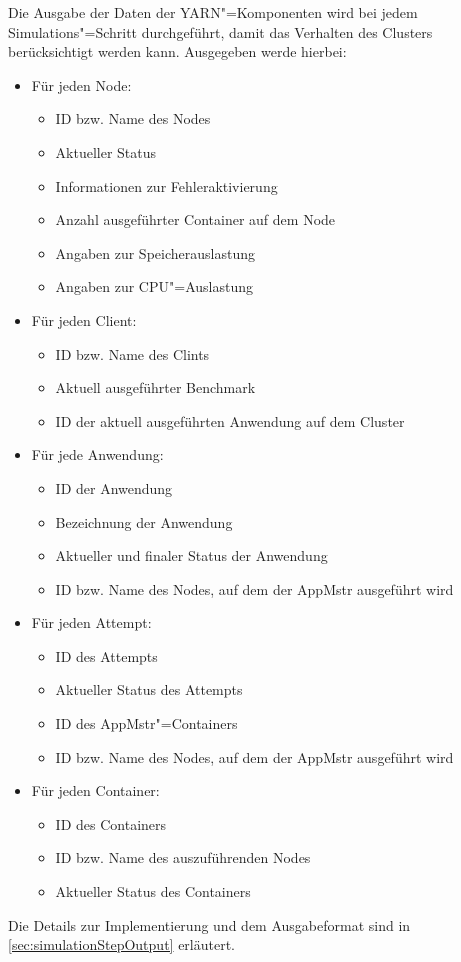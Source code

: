 Die Ausgabe der Daten der YARN"=Komponenten wird bei jedem Simulations"=Schritt durchgeführt, damit das Verhalten des Clusters berücksichtigt werden kann.
Ausgegeben werde hierbei:

\begin{itemize}
    \item Für jeden Node:
    \begin{itemize}
        \item ID bzw. Name des Nodes
        \item Aktueller Status
        \item Informationen zur Fehleraktivierung
        \item Anzahl ausgeführter Container auf dem Node
        \item Angaben zur Speicherauslastung
        \item Angaben zur CPU"=Auslastung
    \end{itemize}
    
    \item Für jeden Client:
    \begin{itemize}
        \item ID bzw. Name des Clints
        \item Aktuell ausgeführter Benchmark
        \item ID der aktuell ausgeführten Anwendung auf dem Cluster
    \end{itemize}

    \item Für jede Anwendung:
    \begin{itemize}
        \item ID der Anwendung
        \item Bezeichnung der Anwendung
        \item Aktueller und finaler Status der Anwendung
        \item ID bzw. Name des Nodes, auf dem der \ac{AppMstr} ausgeführt wird
    \end{itemize}

    \item Für jeden Attempt:
    \begin{itemize}
        \item ID des Attempts
        \item Aktueller Status des Attempts
        \item ID des \ac{AppMstr}"=Containers
        \item ID bzw. Name des Nodes, auf dem der \ac{AppMstr} ausgeführt wird
    \end{itemize}

    \item Für jeden Container:
    \begin{itemize}
        \item ID des Containers
        \item ID bzw. Name des auszuführenden Nodes
        \item Aktueller Status des Containers
    \end{itemize}
\end{itemize}

Die Details zur Implementierung und dem Ausgabeformat sind in \autoref{sec:simulationStepOutput} erläutert.
